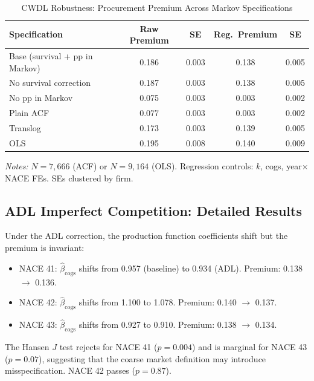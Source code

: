 \documentclass[11pt]{article}
\begin{document}
\begin{table}[htbp]\centering
\caption{CWDL Robustness: Procurement Premium Across Markov Specifications}\label{tab:cwdl}
\begin{threeparttable}
\begin{tabular}{lcccc}
\toprule
Specification & Raw Premium & SE & Reg.\ Premium & SE \\
\midrule
Base (survival + pp in Markov) & 0.186 & 0.003 & 0.138 & 0.005 \\
No survival correction & 0.187 & 0.003 & 0.138 & 0.005 \\
No pp in Markov & 0.075 & 0.003 & 0.003 & 0.002 \\
Plain ACF & 0.077 & 0.003 & 0.003 & 0.002 \\
Translog & 0.173 & 0.003 & 0.139 & 0.005 \\
OLS & 0.195 & 0.008 & 0.140 & 0.009 \\
\bottomrule
\end{tabular}
\begin{tablenotes}\footnotesize
\item \emph{Notes:} $N = 7{,}666$ (ACF) or $N = 9{,}164$ (OLS). Regression controls: $k$, cogs, year$\times$NACE FEs. SEs clustered by firm.
\end{tablenotes}
\end{threeparttable}
\end{table}

\subsection{ADL Imperfect Competition: Detailed Results}\label{app:adl_detail}

Under the ADL correction, the production function coefficients shift but the premium is invariant:

\begin{itemize}[nosep]
    \item NACE 41: $\hat{\beta}_{\text{cogs}}$ shifts from 0.957 (baseline) to 0.934 (ADL). Premium: 0.138 $\to$ 0.136.
    \item NACE 42: $\hat{\beta}_{\text{cogs}}$ shifts from 1.100 to 1.078. Premium: 0.140 $\to$ 0.137.
    \item NACE 43: $\hat{\beta}_{\text{cogs}}$ shifts from 0.927 to 0.910. Premium: 0.138 $\to$ 0.134.
\end{itemize}

The Hansen $J$ test rejects for NACE 41 ($p = 0.004$) and is marginal for NACE 43 ($p = 0.07$), suggesting that the coarse market definition may introduce misspecification. NACE 42 passes ($p = 0.87$).
\end{document}
